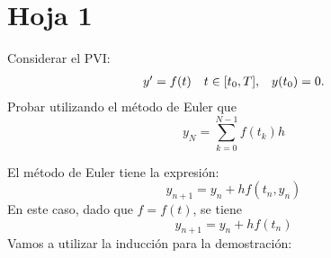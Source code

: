 \section{Hoja 1}

\begin{mathproblem}{1}
Considerar el PVI:
\begin{equation*}
\begin{array}{c c c}
y'=f(t) & t\in[t_0, T], & y(t_0) = 0.
\end{array}
\end{equation*}
Probar utilizando el método de Euler que
$$y_N=\sum_{k=0}^{N-1}f(t_k)h$$
\end{mathproblem}
El método de Euler tiene la expresión:
$$y_{n+1} = y_n + hf(t_n, y_n)$$
En este caso, dado que $f = f(t)$, se tiene 
$$y_{n+1} = y_n + hf(t_n)$$
Vamos a utilizar la inducción para la demostración:

